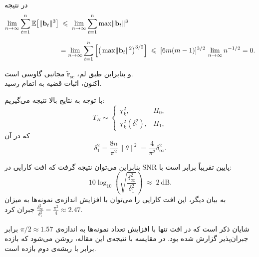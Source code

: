 \begin{اثبات}
	در نتیجه
	\begin{align}
		\lim_{n \to \infty} \sum_{t=1}^{n} 
		\mathbb{E}\!\left[ \lVert \mathbf{b}_{t} \rVert^{3} \right]
		&\;\le\;
		\lim_{n \to \infty} \sum_{t=1}^{n} \max \lVert \mathbf{b}_{t} \rVert^{3} \notag \\[6pt]
		&= \lim_{n \to \infty} \sum_{t=1}^{n} 
		\left[ \big(\max \lVert \mathbf{b}_{t} \rVert^{2}\big)^{3/2} \right]
		\;\le\; [6m(m-1)]^{3/2}\,\lim_{n \to \infty} n^{-1/2}
		= 0.
	\end{align}
	
	و بنابراین طبق لم، \(\tilde{\mathbf{r}}_{\mathrm{sc}}\) مجانبی گاوسی است.\\
	اکنون، اثبات قضیه به اتمام رسید.
	
\end{اثبات}
با توجه به نتایج بالا نتیجه می‌گیریم:
\begin{equation}
	T_{R}\sim
	\begin{cases}
		\chi^{2}_{k}, & H_{0},\\[6pt]
		\chi^{2}_{k}(\delta_{1}^{2}), & H_{1},
	\end{cases} \label{eq:chi_approx}
\end{equation}
که در آن
\begin{equation}
	\delta_{1}^{2}=\frac{8n}{\pi^{2}}\|\theta\|^{2}
	=\frac{4}{\pi^{2}}\delta_{\infty}^{2}.
\end{equation}

بنابراین می‌توان نتیجه گرفت که افت کارایی در SNR پایین تقریباً برابر است با:
\[
10\log_{10}\!\left(\sqrt{\frac{\delta_{\infty}^{2}}{\delta_{1}^{2}}}\right)\;\approx\;2~\mathrm{dB}.
\]
به بیان دیگر، این افت کارایی را می‌توان با افزایش اندازه‌ی نمونه‌ها به میزان
$
\frac{\delta_{\infty}^{2}}{\delta_{1}^{2}}
=\frac{\pi^{2}}{4}\approx 2.47
$
جبران کرد.  

شایان ذکر است که در  افت  تنها با افزایش تعداد نمونه‌ها به اندازه‌ی \linebreak
$\pi/2\approx 1.57$ 
برابر جبران‌پذیر گزارش شده بود.  
در مقایسه با نتیجه‌ی این مقاله، روشن می‌شود که بازده  برابر با ریشه‌ی دوم بازده  است.
